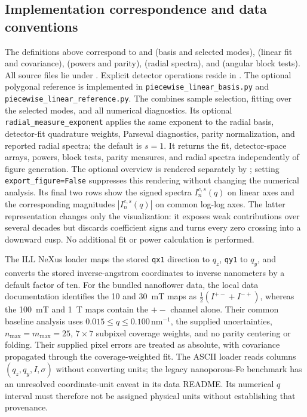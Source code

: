 \documentclass[aps,prb,preprint,onecolumn,notitlepage,amsmath,amssymb,
  superscriptaddress,floatfix]{revtex4-2}
\begin{document}
\subsection{Implementation correspondence and data conventions}

The definitions above correspond to  and 
(basis and selected modes),  (linear fit and covariance),
 (powers and parity),  (radial spectra), and
 (angular block tests). All source files lie under
. Explicit detector operations reside in
. The optional polygonal reference is implemented in
\texttt{piecewise\_linear\_}\allowbreak\texttt{basis.py} and
\texttt{piecewise\_linear\_}\allowbreak\texttt{reference.py}.
The  combines sample
selection, fitting over the selected modes, and all numerical diagnostics.
Its optional \texttt{radial\_measure\_}\allowbreak\texttt{exponent} applies
the same exponent to
the radial basis, detector-fit quadrature weights, Parseval diagnostics,
parity normalization, and reported radial spectra; the default is $s=1$.
It returns the fit, detector-space arrays, powers, block tests, parity
measures, and radial spectra independently of figure generation. The optional
overview is rendered separately by ; setting
\texttt{export\_figure=False} suppresses this rendering without changing the
numerical analysis.  Its final two rows show the signed spectra
$I_n^{c,s}(q)$ on linear axes and the corresponding magnitudes
$|I_n^{c,s}(q)|$ on common log-log axes.  The latter representation changes
only the visualization: it exposes weak contributions over several decades
but discards coefficient signs and turns every zero crossing into a downward
cusp.  No additional fit or power calculation is performed.

The ILL NeXus loader maps the stored \texttt{qx1} direction to $q_z$,
\texttt{qy1} to $q_y$, and converts the stored inverse-angstrom coordinates
to inverse nanometers by a default factor of ten. For the bundled
nanoflower data, the local data documentation identifies the 10 and
30~mT maps as $\tfrac12(I^{+-}+I^{-+})$, whereas the 100~mT and 1~T maps
contain the $+-$ channel alone. Their common baseline analysis uses
$0.015\leq q\leq0.100\,\mathrm{nm}^{-1}$, the supplied uncertainties,
$n_{\max}=m_{\max}=25$, $7\times7$ subpixel coverage weights, and no
parity centering or folding. Their supplied pixel errors are treated as
absolute, with covariance propagated through the coverage-weighted fit.
The ASCII loader reads columns $(q_z,q_y,I,\sigma)$ without converting
units; the legacy nanoporous-Fe benchmark has an unresolved coordinate-unit
caveat in its data README. Its numerical $q$ interval must therefore not
be assigned physical units without establishing that provenance.
\end{document}
